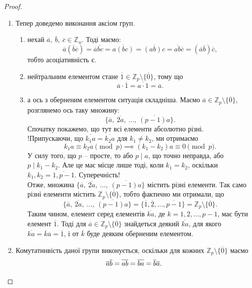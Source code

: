 \documentclass{math_library}
\begin{document}
\begin{proof}
\begin{enumerate}[topsep=0pt,wide=0pt,label={\Roman*.}]
\begin{enumerate}[nosep,wide=0pt,label={\roman*.}]
\item Тепер доведемо виконання аксіом груп.
\begin{enumerate}[nosep,label={\arabic*)}]
\item нехай $\overline{a},\ \overline{b},\ \overline{c} \in \mathbb{Z}_n$. Тоді маємо: 
\[
\overline{a}(\overline{b}\overline{c}) = \overline{a}\overline{bc} = \overline{a(bc)} = \overline{(ab)c} = \overline{ab} \overline{c} = (\overline{a}\overline{b})\overline{c},
\]
тобто асоціативність є.
\item нейтральним елементом стане $\overline{1} \in \mathbb{Z}_p \setminus \{ \overline{0}\}$, тому що
\[ 
\overline{a} \cdot \overline{1} = \overline{a \cdot 1} = \overline{a}.
\]
\item а ось з оберненим елементом ситуація складніша. Маємо $\overline{a} \in \mathbb{Z}_p \setminus \{ \overline{0}\}$, розглянемо ось таку множину: 
\[ 
\{\overline{a},\ \overline{2a},\ \dots,\ \overline{(p-1)a} \}. 
\]
Спочатку покажемо, що тут всі елементи абсолютно різні. \\
!Припускаючи, що $\overline{k_1 a} = \overline{k_2 a}$ для $k_1 \neq k_2$, ми отримаємо 
\[ 
k_1 a \equiv k_2 a \pmod p \implies (k_1-k_2)a \equiv 0 \pmod p.
\] 
У силу того, що $p$ -- просте, то або $p \mid a$, що точно неправда, або $p \mid k_1-k_2$. Але це має місце лише тоді, коли $k_1 = k_2$, оскільки $k_1,k_2 = \overline{1,p-1}$. Суперечність!\\
Отже, множина $\{\overline{a},\ \overline{2a},\ \dots,\ \overline{(p-1)a} \}$ містить різні елементи. Так само різні елементи містить $\mathbb{Z}_p \setminus \{ \overline{0}\}$, тобто фактично ми отримали, що 
\[
\{\overline{a},\ \overline{2a},\ \dots,\ \overline{(p-1)a} \} = \{ \overline{1}, \overline{2}, \dots, \overline{p-1} \} = \mathbb{Z}_p \setminus \{ \overline{0}\}.
\]
Таким чином, елемент серед елементів $\overline{ka}$, де $k = 1,2,\dots,p-1$, має бути елемент $\overline{1}$. Тоді для $\overline{a} \in \mathbb{Z}_p \setminus \{ \overline{0}\}$ знайдеться деякий $\overline{ka}$, для якого $\overline{ka} = \overline{k} \overline{a} = \overline{1}$, і от $\overline{k}$ буде деяким оберненим елементом.
\end{enumerate}

\item Комутатинвість даної групи виконується, оскільки для кожних $\mathbb{Z}_p \setminus \{ \overline{0}\}$ маємо
\[
\overline{a} \overline{b} = \overline{ab} = \overline{ba} = \overline{b} \overline{a}. \qedhere
\]
\end{enumerate}
\end{enumerate}
\end{proof}
\end{document}
